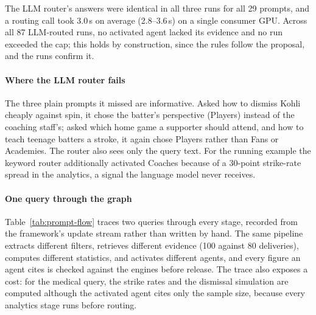 The LLM router's answers were identical in all three runs for all 29 prompts,
and a routing call took 3.0\,s on average (2.8--3.6\,s) on a single consumer
GPU. Across all 87 LLM-routed runs, no activated agent lacked its evidence and
no run exceeded the cap; this holds by construction, since the rules follow the
proposal, and the runs confirm it.

\paragraph{Where the LLM router fails}
The three plain prompts it missed are informative. Asked how to dismiss Kohli
cheaply against spin, it chose the batter's perspective (Players) instead of
the coaching staff's; asked which home game a supporter should attend, and how
to teach teenage batters a stroke, it again chose Players rather than Fans or
Academies. The router also sees only the query text. For the running example
the keyword router additionally activated Coaches because of a 30-point
strike-rate spread in the analytics, a signal the language model never
receives.

\paragraph{One query through the graph}
Table~\ref{tab:prompt-flow} traces two queries through every stage, recorded
from the framework's update stream rather than written by hand. The same
pipeline extracts different filters, retrieves different evidence (100 against
80 deliveries), computes different statistics, and activates different agents,
and every figure an agent cites is checked against the engines before release.
The trace also exposes a cost: for the medical query, the strike rates and the
dismissal simulation are computed although the activated agent cites only the
sample size, because every analytics stage runs before routing.

